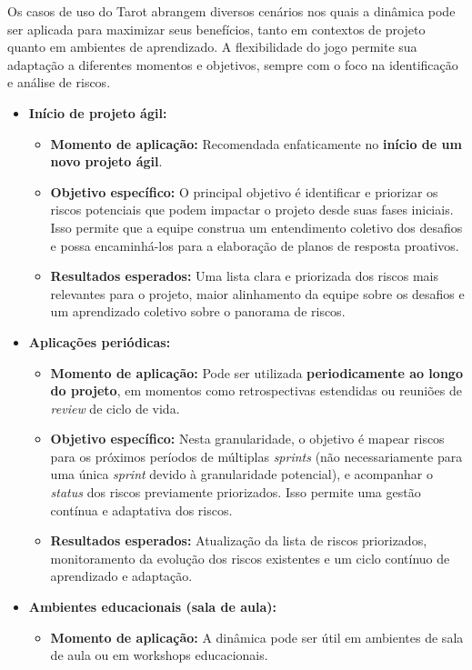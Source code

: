 \documentclass[
	12pt,
	openright,
	twoside,
	a4paper,
	english,
	brazil
	]{abntex2}
\begin{document}
Os casos de uso do Tarot abrangem diversos cenários nos quais a dinâmica pode ser aplicada para maximizar seus benefícios, tanto em contextos de projeto quanto em ambientes de aprendizado. A flexibilidade do jogo permite sua adaptação a diferentes momentos e objetivos, sempre com o foco na identificação e análise de riscos.

\begin{itemize}
\item \textbf{Início de projeto ágil:}
\begin{itemize}
\item \textbf{Momento de aplicação:} Recomendada enfaticamente no \textbf{início de um novo projeto ágil}. 
\item \textbf{Objetivo específico:} O principal objetivo é identificar e priorizar os riscos potenciais que podem impactar o projeto desde suas fases iniciais. Isso permite que a equipe construa um entendimento coletivo dos desafios e possa encaminhá-los para a elaboração de planos de resposta proativos. 
\item \textbf{Resultados esperados:} Uma lista clara e priorizada dos riscos mais relevantes para o projeto, maior alinhamento da equipe sobre os desafios e um aprendizado coletivo sobre o panorama de riscos. 
\end{itemize}
\item \textbf{Aplicações periódicas:}
\begin{itemize}
\item \textbf{Momento de aplicação:} Pode ser utilizada \textbf{periodicamente ao longo do projeto}, em momentos como retrospectivas estendidas ou reuniões de \textit{review} de ciclo de vida. 
\item \textbf{Objetivo específico:} Nesta granularidade, o objetivo é mapear riscos para os próximos períodos de múltiplas \textit{sprints} (não necessariamente para uma única \textit{sprint} devido à granularidade potencial), e acompanhar o \textit{status} dos riscos previamente priorizados. Isso permite uma gestão contínua e adaptativa dos riscos.
\item \textbf{Resultados esperados:} Atualização da lista de riscos priorizados, monitoramento da evolução dos riscos existentes e um ciclo contínuo de aprendizado e adaptação. 
\end{itemize}
\item \textbf{Ambientes educacionais (sala de aula):}
\begin{itemize}
\item \textbf{Momento de aplicação:} A dinâmica pode ser útil em ambientes de sala de aula ou em workshops educacionais. 

\end{itemize}
\end{itemize}
\end{document}
